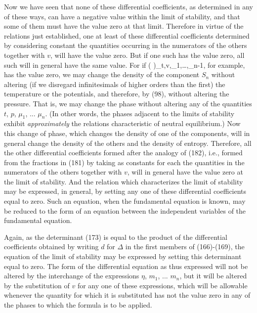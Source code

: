 \documentclass[12pt]{memoir}
\begin{document}
Now we have seen that none of these differential coefficients, as determined in any of these ways, can have a negative value within the limit of stability, and that some of them must have the value zero at that limit. Therefore in virtue of the relations just established, one at least of these differential coefficients determined by considering
constant the quantities occurring in the numerators of the others together with $v$, will have the value zero. But if one such has the value zero, all such will in general have the same value. For if
\eqs \left( \right)_{t,v,\mu_1,\dots,\mu_{n-1}}, \label{182}\eqe
for example, has the value zero, we may change the density of the component $S_n$ without altering (if we disregard infinitesimals of higher orders than the first) the temperature or the potentials, and therefore, by (98), without altering the pressure. That is, we may change the phase without altering any of the quantities $t$, $p$, $\mu_1$, ... $\mu_n$. (In other words, the phases adjacent to the limits of stability exhibit \textit{approximately} the relations characteristic of neutral equilibrium.) Now this change of phase, which changes the density of one of the components, will in general change the density of the others and the density of entropy.  Therefore, all the other differential coefficients formed after the analogy of (182), i.e., formed from the fractions in (181) by taking as constants for each the quantities in the numerators of the others together with $v$, will in general have the value zero at the limit of stability.  And the relation which characterizes the limit of stability may be expressed, in general, by setting any one of these differential coefficients equal to zero. Such an equation, when the fundamental equation is known, may be reduced to the form of an equation between the independent variables of the fundamental equation.


Again, as the determinant (173) is equal to the product of the differential coefficients obtained by writing $d$ for $\Delta$ in the first members of (166)-(169), the equation of the limit of stability may be expressed by setting this determinant equal to zero. The form of the differential equation as thus expressed will not be altered by the interchange of the expressions $\eta$, $m_1$, ... $m_n$, but it will be altered by the substitution of $v$ for any one of these expressions, which will be allowable whenever the quantity for which it is substituted has not the value zero in any of the phases to which the formula is to be applied.
\end{document}
